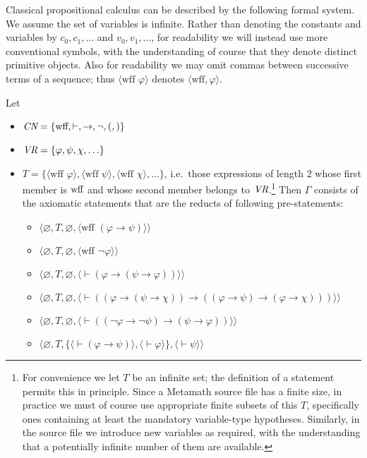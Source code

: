 Classical propositional calculus can be described by the following formal
system.  We assume the set of variables is infinite.  Rather than denoting the
constants and variables by $c_0, c_1, \ldots$ and $v_0, v_1, \ldots$, for
readability we will instead use more conventional symbols, with the
understanding of course that they denote distinct primitive objects.
Also for readability we may omit commas between successive terms of a
sequence; thus $\langle \mbox{wff\ } \varphi\rangle$ denotes
$\langle \mbox{wff}, \varphi\rangle$.

Let
\begin{itemize}
  \item[] $\mbox{\em CN}=\{\mbox{wff}, \vdash, \to, \lnot, (,)\}$
  \item[] $\mbox{\em VR}=\{\varphi,\psi,\chi,\ldots\}$
  \item[] $T = \{\langle \mbox{wff\ } \varphi\rangle,
             \langle \mbox{wff\ } \psi\rangle,
             \langle \mbox{wff\ } \chi\rangle,\ldots\}$, i.e.\ those
             expressions of length 2 whose first member is $\mbox{\rm wff}$
             and whose second member belongs to $\mbox{\em VR}$.\footnote{For
convenience we let $T$ be an infinite set; the definition of a statement
permits this in principle.  Since a Metamath source file has a finite size, in
practice we must of course use appropriate finite subsets of this $T$,
specifically ones containing at least the mandatory variable-type
hypotheses.  Similarly, in the source file we introduce new variables as
required, with the understanding that a potentially infinite number of
them are available.}
\noindent Then $\Gamma$ consists of the axiomatic statements that
are the reducts of following pre-statements:
    \begin{itemize}
      \item[] $\langle\varnothing,T,\varnothing,
               \langle \mbox{wff\ }(\varphi\to\psi)\rangle\rangle$
      \item[] $\langle\varnothing,T,\varnothing,
               \langle \mbox{wff\ }\lnot\varphi\rangle\rangle$
      \item[] $\langle\varnothing,T,\varnothing,
               \langle \vdash(\varphi\to(\psi\to\varphi))
               \rangle\rangle$
      \item[] $\langle\varnothing,T,
               \varnothing,
               \langle \vdash((\varphi\to(\psi\to\chi))\to
               ((\varphi\to\psi)\to(\varphi\to\chi)))
               \rangle\rangle$
      \item[] $\langle\varnothing,T,
               \varnothing,
               \langle \vdash((\lnot\varphi\to\lnot\psi)\to
               (\psi\to\varphi))\rangle\rangle$
      \item[] $\langle\varnothing,T,
               \{\langle\vdash(\varphi\to\psi)\rangle,
                 \langle\vdash\varphi\rangle\},
               \langle\vdash\psi\rangle\rangle$
    \end{itemize}
\end{itemize}

